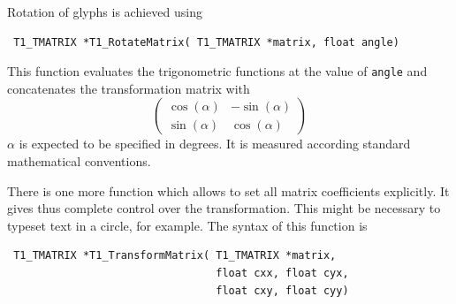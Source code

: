 Rotation of glyphs is achieved using 
\precorr
\begin{verbatim}
 T1_TMATRIX *T1_RotateMatrix( T1_TMATRIX *matrix, float angle)
\end{verbatim}\postcorr
This function evaluates the trigonometric functions at the value of
\verb+angle+ and concatenates the transformation matrix with 
\begin{displaymath}
\left( 
\begin{array}{cc}
\cos(\alpha)  & -\sin(\alpha) \\
\sin(\alpha) & \cos(\alpha)
\end{array}
\right)
\end{displaymath}
$\alpha$ is expected to be specified in degrees. It is measured according
standard mathematical conventions.

There is one more function which allows to set all matrix coefficients
explicitly. It gives thus complete control over the transformation. This might
be necessary to typeset text in a circle, for example. The syntax of this
function is
\precorr
\begin{verbatim}
 T1_TMATRIX *T1_TransformMatrix( T1_TMATRIX *matrix, 
                                 float cxx, float cyx,
                                 float cxy, float cyy)
\end{verbatim}\postcorr

